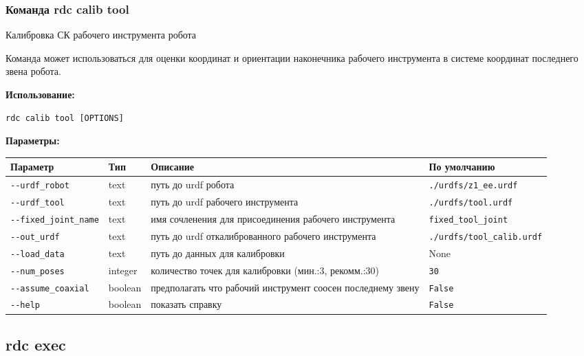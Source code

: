 \hypertarget{rdc-calib-tool}{%
\subsubsection{ Команда rdc calib tool}\label{rdc-calib-tool}}

Калибровка СК рабочего инструмента робота

Команда может использоваться для оценки координат и ориентации наконечника рабочего инструмента в системе координат последнего звена робота.

\textbf{Использование:}
\begin{lstlisting}[language=python, numbers=none, frame=single]
rdc calib tool [OPTIONS]
\end{lstlisting}

\textbf{Параметры:}
\begin{center}
\fontsize{10pt}{10pt}\selectfont
\begin{longtable}[]{p{4.5cm}|p{2cm}|p{4.0cm}|p{5.2cm}}
    \hline
\toprule()
Параметр & Тип & Описание & По умолчанию \\
\hline
\midrule()
\endhead
\texttt{-\/-urdf\_robot} & text & путь до urdf робота &
\texttt{./urdfs/z1\_ee.urdf} \\
\hline
\texttt{-\/-urdf\_tool} & text & путь до urdf рабочего инструмента &
\texttt{./urdfs/tool.urdf} \\
\hline
\texttt{-\/-fixed\_joint\_name} & text & имя сочленения для присоединения рабочего инструмента &
\texttt{fixed\_tool\_joint} \\
\hline
\texttt{-\/-out\_urdf} & text & путь до urdf откалиброванного рабочего инструмента &
\texttt{./urdfs/tool\_calib.urdf} \\
\hline
\texttt{-\/-load\_data} & text & путь до данных для калибровки & None \\
\hline
\texttt{-\/-num\_poses} & integer & количество  точек для калибровки
(мин.:3, рекомм.:30) & \texttt{30} \\
\hline
\texttt{-\/-assume\_coaxial} & boolean & предполагать что рабочий инструмент соосен последнему звену & \texttt{False} \\
\hline
\texttt{-\/-help} & boolean & показать справку &
\texttt{False} \\
\bottomrule()
\hline
\end{longtable}
\end{center}

\hypertarget{rdc-exec}{%
\subsection{rdc exec}\label{rdc-exec}}

